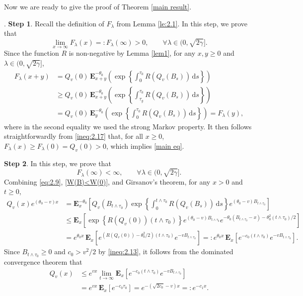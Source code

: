 \documentclass[11pt]{article}
\numberwithin{equation}{section}
\begin{document}
\bigskip 
Now we are ready to give the proof of Theorem \ref{main result}.
\bigskip 

. 
{\bf Step 1}. 
Recall the definition of $F_\lambda$ from Lemma \ref{le:2.1}. In this step, we prove that
\begin{equation}\label{main eq}
	\lim_{x \to \infty} F_\lambda(x) =: F_\lambda(\infty) > 0, \qquad \forall \lambda \in (0, \sqrt{2\gamma}].
\end{equation}
Since the function $R$ is non-negative by Lemma \ref{lem1}, for any $x, y \ge 0$ and $\lambda \in (0, \sqrt{2\gamma}]$,
\begin{align}\label{ineq:2.17}
	F_\lambda(x + y)
	&= Q_v(0) \, \mathbf E_{x+y}^{-\theta_0} \left( \exp\left\{ \int_0^{\tau_0} R(Q_v(B_s)) \, \mathrm{d}s \right\} \right) \nonumber \\
	&\ge Q_v(0) \, \mathbf E_{x+y}^{-\theta_0} \left( \exp\left\{ \int_{\tau_y}^{\tau_0} R(Q_v(B_s)) \, \mathrm{d}s \right\} \right) \nonumber \\
	&= Q_v(0) \, \mathbf E_y^{-\theta_0} \left( \exp\left\{ \int_0^{\tau_0} R(Q_v(B_s)) \, \mathrm{d}s \right\} \right) = F_\lambda(y),
\end{align}
where in the second equality we used the strong Markov property. It then follows straightforwardly from \eqref{ineq:2.17} that, for all $x \ge 0$, $F_\lambda(x) \ge F_\lambda(0) = Q_v(0) > 0$, which implies \eqref{main eq}.

{\bf Step 2}. In this step, we prove that
\begin{equation}\label{main eq2}
	F_\lambda(\infty) < \infty, \qquad \forall \lambda \in (0, \sqrt{2\gamma}].
\end{equation}
Combining \eqref{eq:2.9}, \eqref{W(B)<W(0)}, and Girsanov's theorem, for any $x > 0$ and $t \ge 0$,
\begin{align*}
	Q_v(x)
	 e^{(\theta_0 - v)x}
	&= \mathbf E_x^{-\theta_0}
	\left[
	Q_v(B_{t \wedge \tau_0}) \exp\left\{ \int_0^{t \wedge \tau_0} R(Q_v(B_s)) \, \mathrm{d}s \right\}
	e^{(\theta_0 - v) B_{t \wedge \tau_0}}
	\right] \nonumber \\
	&\le \mathbf E_x
	\left[
	\exp\left\{ R(Q_v(0)) (t \wedge \tau_0) \right\}
	e^{(\theta_0 - v) B_{t \wedge \tau_0}}
	e^{-\theta_0 (B_{t \wedge \tau_0} - x) - \theta_0^2 (t \wedge \tau_0)/2}
	\right] \nonumber \\
	&= e^{\theta_0 x} \, \mathbf E_x
	\left[ e^{(R(Q_v(0)) - \theta_0^2/2)(t \wedge \tau_0)} e^{-v B_{t \wedge \tau_0}} \right]
	=: e^{\theta_0 x} \, \mathbf E_x
	\left[ e^{-c_0 (t \wedge \tau_0)} e^{-v B_{t \wedge \tau_0}} \right].
\end{align*}
Since $B_{t \wedge \tau_0} \ge 0$ and $c_0 > v^2/2$ by \eqref{ineq:2.13}, it follows from the dominated convergence theorem that
\begin{align}
	Q_v(x)
	 &\le e^{v x} \lim_{t \to \infty} \mathbf E_x
	\left[ e^{-c_0 (t \wedge \tau_0)} e^{-v B_{t \wedge \tau_0}} \right] \nonumber \\
	&= e^{v x} \, \mathbf E_x \left[ e^{-c_0 \tau_0} \right]
	= e^{-(\sqrt{2c_0} - v)x} =: e^{-c_1 x}.
\end{align}
\end{document}
